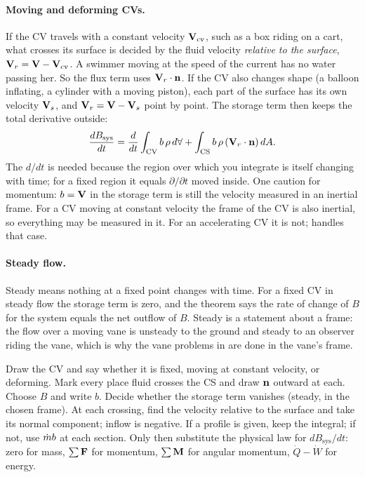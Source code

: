 \paragraph{Moving and deforming CVs.} If the CV travels with a constant velocity $\mathbf{V}_\text{cv}$, such as a box riding on a cart, what crosses its surface is decided by the fluid velocity \emph{relative to the surface}, $\mathbf{V}_r = \mathbf{V} - \mathbf{V}_\text{cv}$. A swimmer moving at the speed of the current has no water passing her. So the flux term uses $\mathbf{V}_r\cdot\mathbf{n}$. If the CV also changes shape (a balloon inflating, a cylinder with a moving piston), each part of the surface has its own velocity $\mathbf{V}_s$, and $\mathbf{V}_r = \mathbf{V} - \mathbf{V}_s$ point by point. The storage term then keeps the total derivative outside:
\[
\frac{dB_\text{sys}}{dt} = \frac{d}{dt}\int_\text{CV} b\,\rho\, d\forall + \int_\text{CS} b\,\rho\,(\mathbf{V}_r\cdot\mathbf{n})\, dA .
\]
The $d/dt$ is needed because the region over which you integrate is itself changing with time; for a fixed region it equals $\partial/\partial t$ moved inside. One caution for momentum: $b = \mathbf{V}$ in the storage term is still the velocity measured in an inertial frame. For a CV moving at constant velocity the frame of the CV is also inertial, so everything may be measured in it. For an accelerating CV it is not;  handles that case.

\paragraph{Steady flow.} Steady means nothing at a fixed point changes with time. For a fixed CV in steady flow the storage term is zero, and the theorem says the rate of change of $B$ for the system equals the net outflow of $B$. Steady is a statement about a frame: the flow over a moving vane is unsteady to the ground and steady to an observer riding the vane, which is why the vane problems in  are done in the vane's frame.

\begin{firstmoves}
Draw the CV and say whether it is fixed, moving at constant velocity, or deforming. Mark every place fluid crosses the CS and draw $\mathbf{n}$ outward at each. Choose $B$ and write $b$. Decide whether the storage term vanishes (steady, in the chosen frame). At each crossing, find the velocity relative to the surface and take its normal component; inflow is negative. If a profile is given, keep the integral; if not, use $\dot m b$ at each section. Only then substitute the physical law for $dB_\text{sys}/dt$: zero for mass, $\sum\mathbf{F}$ for momentum, $\sum\mathbf{M}$ for angular momentum, $\dot Q - \dot W$ for energy.
\end{firstmoves}


